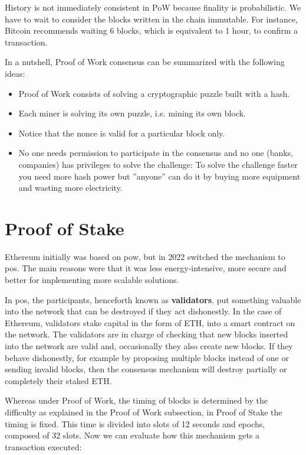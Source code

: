 \documentclass[a4paper,12pt]{article}
\begin{document}
\begin{appendices}
{History is not immediately consistent in PoW because finality is probabilistic. We have to wait to consider the blocks written in the chain immutable. For instance, Bitcoin recommends waiting 6 blocks, which is equivalent to 1 hour, to confirm a transaction.

{In a nutshell, Proof of Work consensus can be summarized with the following ideas:}
\begin{itemize}
    \item Proof of Work consists of solving a cryptographic puzzle built with a hash.
    \item Each miner is solving its own puzzle, i.e. mining its own block.
    \item Notice that the nonce is valid for a particular block only.
    \item No one needs permission to participate in the consensus and no one (banks, companies) has privileges to solve the challenge: To solve the challenge faster you need more hash power but ”anyone” can do it by buying more equipment and wasting more electricity.
\end{itemize}
}

\section{Proof of Stake}
\label{appendix:proof-of-stake}
{
{Ethereum initially was based on \acrlong{pow}, but in 2022 switched the mechanism to \acrfull{pos}\cite{proof-of-stake}. The main reasons were that it was less energy-intensive, more secure and better for implementing more scalable solutions.

In \acrlong{pos}, the participants, henceforth known as \textbf{validators}, put something valuable into the network that can be destroyed if they act dishonestly. In the case of Ethereum, validators stake capital in the form of ETH, into a smart contract on the network. The validators are in charge of checking that new blocks inserted into the network are valid and, occasionally they also create new blocks. If they behave dishonestly, for example by proposing multiple blocks instead of one or sending invalid blocks, then the consensus mechanism will destroy partially or completely their staked ETH.

Whereas under Proof of Work, the timing of blocks is determined by the difficulty as explained in the Proof of Work subsection, in Proof of Stake the timing is fixed. This time is divided into slots of 12 seconds and epochs, composed of 32 slots. Now we can evaluate how this mechanism gets a transaction executed:
}

}
\end{appendices}
\end{document}
